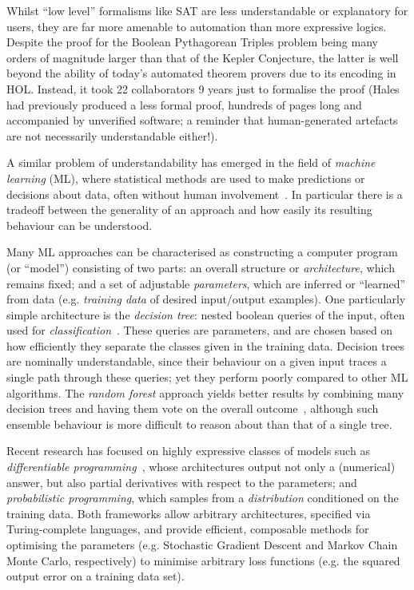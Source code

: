 \documentclass{article}
\begin{document}
Whilst ``low level'' formalisms like SAT are less understandable or explanatory
for users, they are far more amenable to automation than more expressive logics.
Despite the proof for the Boolean Pythagorean Triples problem being many orders
of magnitude larger than that of the Kepler Conjecture, the latter is well
beyond the ability of today's automated theorem provers due to its encoding in
HOL. Instead, it took 22 collaborators 9 years just to formalise the proof
(Hales had previously produced a less formal proof, hundreds of pages long and
accompanied by unverified software; a reminder that human-generated artefacts
are not necessarily understandable either!).

A similar problem of understandability has emerged in the field of \emph{machine
  learning} (ML), where statistical methods are used to make predictions or
decisions about data, often without human
involvement~\cite{alpaydin2014introduction}. In particular there is a tradeoff
between the generality of an approach and how easily its resulting behaviour can
be understood.

Many ML approaches can be characterised as constructing a computer program (or
``model'') consisting of two parts: an overall structure or \emph{architecture},
which remains fixed; and a set of adjustable \emph{parameters}, which are
inferred or ``learned'' from data (e.g. \emph{training data} of desired
input/output examples). One particularly simple architecture is the
\emph{decision tree}: nested boolean queries of the input, often used for
\emph{classification}~\cite{safavian1991survey}. These queries are parameters,
and are chosen based on how efficiently they separate the classes given in the
training data.  Decision trees are nominally understandable, since their
behaviour on a given input traces a single path through these queries; yet they
perform poorly compared to other ML algorithms. The \emph{random forest}
approach yields better results by combining many decision trees and having them
vote on the overall outcome~\cite{randomforests}, although such ensemble
behaviour is more difficult to reason about than that of a single tree.

Recent research has focused on highly expressive classes of models such as
\emph{differentiable programming}~\cite{wang2018demystifying}, whose
architectures output not only a (numerical) answer, but also partial derivatives
with respect to the parameters; and \emph{probabilistic programming}, which
samples from a \emph{distribution} conditioned on the training data. Both
frameworks allow arbitrary architectures, specified via Turing-complete
languages, and provide efficient, composable methods for optimising the
parameters (e.g. Stochastic Gradient Descent and Markov Chain Monte Carlo,
respectively) to minimise arbitrary loss functions (e.g. the squared output
error on a training data set).
\end{document}
